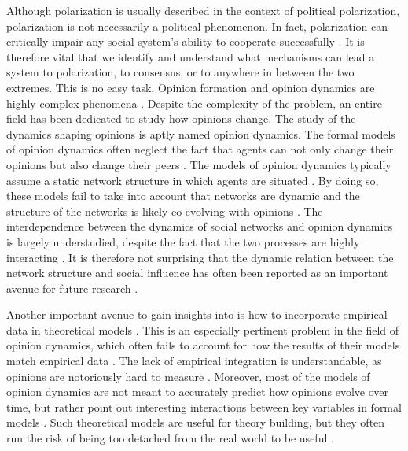 \documentclass[11pt]{article}
\begin{document}
\noindent Although polarization is usually described in the context of political polarization, polarization is not necessarily a political phenomenon. In fact, polarization can critically impair any social system's ability to cooperate successfully \cite{levin_dynamics_2021}. It is therefore vital that we identify and understand what mechanisms can lead a system to polarization, to consensus, or to anywhere in between the two extremes. This is no easy task. Opinion formation and opinion dynamics are highly complex phenomena \cite{baumann2021modeling}. 
Despite the complexity of the problem, an entire field has been dedicated to study how opinions change. The study of the dynamics shaping opinions is aptly named opinion dynamics. The formal models of opinion dynamics often neglect the fact that agents can not only change their opinions but also change their peers \cite{flache_models_2017}. The models of opinion dynamics typically assume a static network structure in which agents are situated \cite{galesic_integrating_2021}. By doing so, these models fail to take into account that networks are dynamic and the structure of the networks is likely co-evolving with opinions \cite{de2022modelling,galesic_integrating_2021}. The interdependence between the dynamics of social networks and opinion dynamics is largely understudied, despite the fact that the two processes are highly interacting \cite{asikainen_cumulative_2020,bruch_agent-based_2015,galesic_integrating_2021,kossinets_origins_2009,noorazar_classical_2020}. It is therefore not surprising that the dynamic relation between the network structure and social influence has often been reported as an important avenue for future research \cite{flache_models_2017,galesic_integrating_2021}. 

\noindent Another important avenue to gain insights into is how to incorporate empirical data in theoretical models \cite{mas2019challenges}. This is an especially pertinent problem in the field of opinion dynamics, which often fails to account for how the results of their models match empirical data \cite{galesic_integrating_2021,flache_models_2017, mas2019challenges}. 
The lack of empirical integration is understandable, as opinions are notoriously hard to measure \cite{mas2019challenges}. Moreover, most of the models of opinion dynamics are not meant to accurately predict how opinions evolve over time, but rather point out interesting interactions between key variables in formal models \cite{mas2019challenges}. Such theoretical models are useful for theory building, but they often run the risk of being too detached from the real world to be useful \cite{smaldino_how_2020, mas2019challenges}.  
\end{document}

